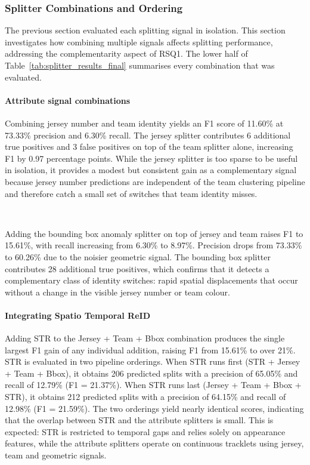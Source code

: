 \subsubsection{Splitter Combinations and Ordering}\label{sec:splitter_combinations}

The previous section evaluated each splitting signal in isolation. This section investigates how combining multiple signals affects splitting performance, addressing the complementarity aspect of RSQ1. The lower half of Table~\ref{tab:splitter_results_final} summarises every combination that was evaluated.

\paragraph{Attribute signal combinations}
Combining jersey number and team identity yields an F1 score of 11.60\% at 73.33\% precision and 6.30\% recall. The jersey splitter contributes 6 additional true positives and 3 false positives on top of the team splitter alone, increasing F1 by 0.97 percentage points. While the jersey splitter is too sparse to be useful in isolation, it provides a modest but consistent gain as a complementary signal because jersey number predictions are independent of the team clustering pipeline and therefore catch a small set of switches that team identity misses.

\

Adding the bounding box anomaly splitter on top of jersey and team raises F1 to 15.61\%, with recall increasing from 6.30\% to 8.97\%. Precision drops from 73.33\% to 60.26\% due to the noisier geometric signal. The bounding box splitter contributes 28 additional true positives, which confirms that it detects a complementary class of identity switches: rapid spatial displacements that occur without a change in the visible jersey number or team colour.

\paragraph{Integrating Spatio Temporal ReID}
Adding STR to the Jersey + Team + Bbox combination produces the single largest F1 gain of any individual addition, raising F1 from 15.61\% to over 21\%. STR is evaluated in two pipeline orderings. When STR runs first (STR + Jersey + Team + Bbox), it obtains 206 predicted splits with a precision of 65.05\% and recall of 12.79\% (F1 = 21.37\%). When STR runs last (Jersey + Team + Bbox + STR), it obtains 212 predicted splits with a precision of 64.15\% and recall of 12.98\% (F1 = 21.59\%). The two orderings yield nearly identical scores, indicating that the overlap between STR and the attribute splitters is small. This is expected: STR is restricted to temporal gaps and relies solely on appearance features, while the attribute splitters operate on continuous tracklets using jersey, team and geometric signals.

